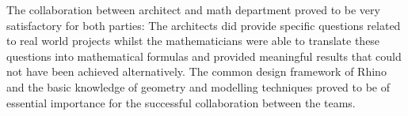 \documentclass[article.tex]{subfiles}
\begin{document}
The collaboration between architect and math department proved to be
very satisfactory for both parties: The architects did provide
specific questions related to real world projects whilst the
mathematicians were able to translate these questions into
mathematical formulas and provided meaningful results that could not
have been achieved alternatively. The common design framework of Rhino
and the basic knowledge of \nurbs geometry and modelling techniques
proved to be of essential importance for the successful collaboration
between the teams.


%
%
%
%
%

\end{document}
